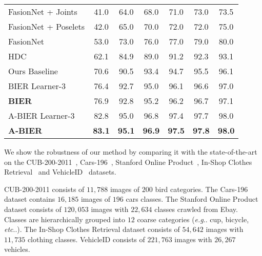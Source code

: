 \documentclass[10pt,journal,compsoc]{IEEEtran}
\makeatletter
\DeclareRobustCommand\onedot{\futurelet\@let@token\@onedot}
\def\@onedot{\ifx\@let@token.\else.\null\fi\xspace}
\def\eg{\emph{e.g}\onedot} \def\Eg{\emph{E.g}\onedot}
\def\etc{\emph{etc}\onedot} \def\vs{\emph{vs}\onedot}
\makeatother
\begin{document}
\begin{table*}[!htbp]
\begin{minipage}[t]{0.5\textwidth}
\begin{tabular}{l|cccccc}
    \hline
    FasionNet + Joints \cite{liu2016deepfashion}   & 41.0 & 64.0 & 68.0 & 71.0 & 73.0 & 73.5 \\
    FasionNet + Poselets \cite{liu2016deepfashion} & 42.0 & 65.0 & 70.0 & 72.0 & 72.0 & 75.0 \\
    FasionNet \cite{liu2016deepfashion}            & 53.0 & 73.0 & 76.0 & 77.0 & 79.0 & 80.0 \\
    HDC~\cite{yuan2016hard}                        & 62.1 & 84.9 & 89.0 & 91.2 & 92.3 & 93.1 \\
    \hline
    Ours Baseline                                  & 70.6 & 90.5 & 93.4 & 94.7 & 95.5 & 96.1 \\
    BIER Learner-3~\cite{opitz2017bier}            & 76.4 & 92.7 & 95.0 & 96.1 & 96.6 & 97.0 \\
    \textbf{BIER}~\cite{opitz2017bier}             & 76.9 & 92.8 & 95.2 & 96.2 & 96.7 & 97.1 \\
    \hline
    A-BIER Learner-3                     & 82.8 & 95.0     & 96.8              & 97.4              &  97.7             & 98.0          \\
    \textbf{A-BIER}                      & \textbf{83.1} & \textbf{95.1}          & \textbf{96.9}          & \textbf{97.5}          & \textbf{97.8}          & \textbf{98.0}          \\
    \hline
    
    \end{tabular}
    \end{minipage}
\end{table*}

We show the robustness of our method by comparing it with the state-of-the-art on the 
CUB-200-2011~\cite{WahCUB_200_2011}, Cars-196~\cite{krause20133d}, 
Stanford Online Product~\cite{oh2016deep}, In-Shop Clothes Retrieval~\cite{liu2016deepfashion} and VehicleID~\cite{liu2016deep} datasets. 

CUB-200-2011 consists of $11,788$ images of $200$ bird categories. 
The Cars-196 dataset contains $16,185$ images of $196$
cars classes. The Stanford Online Product dataset consists of $120,053$ images
with $22,634$ classes crawled from Ebay. Classes are hierarchically grouped into $12$ coarse categories (\eg cup, bicycle, \etc).
The In-Shop Clothes Retrieval dataset consists of $54,642$ images with $11,735$ clothing classes.
VehicleID consists of $221,763$ images with $26,267$ vehicles.
\end{document}
